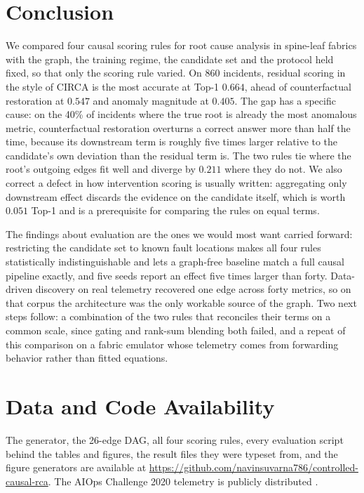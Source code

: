 \documentclass[conference]{IEEEtran}
\begin{document}
\section{Conclusion}
We compared four causal scoring rules for root cause analysis in spine-leaf fabrics with the graph, the training regime, the candidate set and the protocol held fixed, so that only the scoring rule varied. On 860 incidents, residual scoring in the style of CIRCA is the most accurate at Top-1 $0.664$, ahead of counterfactual restoration at $0.547$ and anomaly magnitude at $0.405$. The gap has a specific cause: on the 40\% of incidents where the true root is already the most anomalous metric, counterfactual restoration overturns a correct answer more than half the time, because its downstream term is roughly five times larger relative to the candidate's own deviation than the residual term is. The two rules tie where the root's outgoing edges fit well and diverge by $0.211$ where they do not. We also correct a defect in how intervention scoring is usually written: aggregating only downstream effect discards the evidence on the candidate itself, which is worth $0.051$ Top-1 and is a prerequisite for comparing the rules on equal terms.

The findings about evaluation are the ones we would most want carried forward: restricting the candidate set to known fault locations makes all four rules statistically indistinguishable and lets a graph-free baseline match a full causal pipeline exactly, and five seeds report an effect five times larger than forty. Data-driven discovery on real telemetry recovered one edge across forty metrics, so on that corpus the architecture was the only workable source of the graph. Two next steps follow: a combination of the two rules that reconciles their terms on a common scale, since gating and rank-sum blending both failed, and a repeat of this comparison on a fabric emulator whose telemetry comes from forwarding behavior rather than fitted equations.

\section*{Data and Code Availability}
The generator, the 26-edge DAG, all four scoring rules, every evaluation script behind the tables and figures, the result files they were typeset from, and the figure generators are available at \url{https://github.com/navinsuvarna786/controlled-causal-rca}. The AIOps Challenge 2020 telemetry is publicly distributed \cite{netmanaioops2020dataset}.



\end{document}
